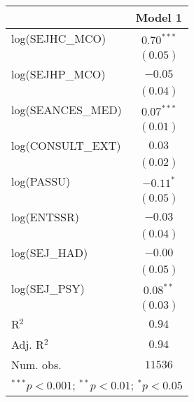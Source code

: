 
\usepackage{booktabs}

\begin{tabular}{l c}
\toprule
 & Model 1 \\
\midrule
log(SEJHC\_MCO)   & $0.70^{***}$ \\
                  & $(0.05)$     \\
log(SEJHP\_MCO)   & $-0.05$      \\
                  & $(0.04)$     \\
log(SEANCES\_MED) & $0.07^{***}$ \\
                  & $(0.01)$     \\
log(CONSULT\_EXT) & $0.03$       \\
                  & $(0.02)$     \\
log(PASSU)        & $-0.11^{*}$  \\
                  & $(0.05)$     \\
log(ENTSSR)       & $-0.03$      \\
                  & $(0.04)$     \\
log(SEJ\_HAD)     & $-0.00$      \\
                  & $(0.05)$     \\
log(SEJ\_PSY)     & $0.08^{**}$  \\
                  & $(0.03)$     \\
\midrule
R$^2$             & $0.94$       \\
Adj. R$^2$        & $0.94$       \\
Num. obs.         & $11536$      \\
\bottomrule
\multicolumn{2}{l}{\scriptsize{$^{***}p<0.001$; $^{**}p<0.01$; $^{*}p<0.05$}}
\end{tabular}

